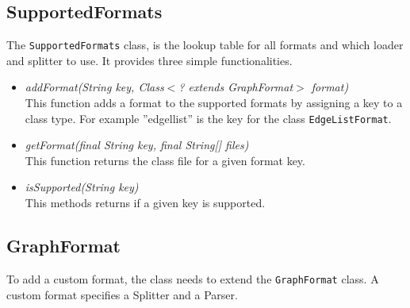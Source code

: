 \subsection{SupportedFormats}
The \texttt{SupportedFormats} class, is the lookup table for all formats and which loader and splitter to use. It provides three simple functionalities.
\begin{itemize}
 \item[] \textit{addFormat(String key, Class$<$? extends GraphFormat$>$ format)}\\
 This function adds a format to the supported formats by assigning a key to a class type. For example ''{edgellist}'' is the key for the class \texttt{EdgeListFormat}.
 \item[] \textit{getFormat(final String key, final String[] files)}\\
 This function returns the class file for a given format key.
 \item[] \textit{isSupported(String key)}\\
This methods returns if a given key is supported.
\end{itemize}

\subsection{GraphFormat}
To add a custom format, the class needs to extend the \texttt{GraphFormat} class. A custom format specifies a Splitter and a Parser.

